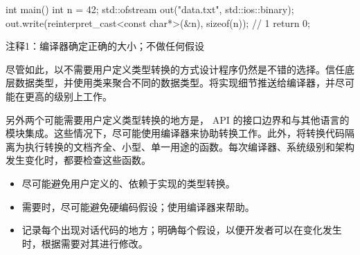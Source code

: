 
\begin{cpp}
int main() {
  int n = 42;
  std::ofstream out("data.txt", std::ios::binary);
  out.write(reinterpret_cast<const char*>(&n),
    sizeof(n)); // 1
  return 0;
}
\end{cpp}

{\footnotesize
注释1：编译器确定正确的大小；不做任何假设
}

尽管如此，以不需要用户定义类型转换的方式设计程序仍然是不错的选择。信任底层数据类型，并使用类来聚合不同的数据类型。将实现细节推送给编译器，并尽可能在更高的级别上工作。

另外两个可能需要用户定义类型转换的地方是， API 的接口边界和与其他语言的模块集成。这些情况下，尽可能使用编译器来协助转换工作。此外，将转换代码隔离为执行转换的文档齐全、小型、单一用途的函数。每次编译器、系统级别和架构发生变化时，都要检查这些函数。


\begin{itemize}
\item
尽可能避免用户定义的、依赖于实现的类型转换。

\item
需要时，尽可能避免硬编码假设；使用编译器来帮助。

\item
记录每个出现对话代码的地方；明确每个假设，以便开发者可以在变化发生时，根据需要对其进行修改。
\end{itemize}










